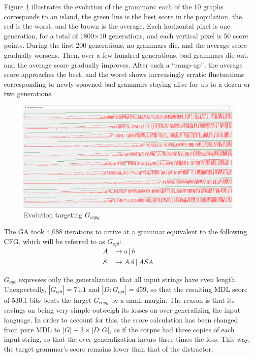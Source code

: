 \documentclass{article}
\begin{document}
Figure \ref{fig:progress} illustrates the evolution of the grammars:
each of the 10 graphs corresponds to an island, the green line is the best score in the population,
the red is the worst, and the brown is the average. Each horizontal pixel is one generation,
for a total of 1800$\times$10 generations, and each vertical pixel is 50 score points.
During the first 200 generations, no grammars die, and the average score gradually worsens.
Then, over a few hundred generations, bad grammars die out, and the average score gradually improves.
After such a ``ramp-up'', the average score approaches the best, and the worst shows
increasingly erratic fluctuations corresponding to newly spawned bad grammars staying alive
for up to a dozen or two generations.

\begin{figure}[b!]
\includegraphics[width=\textwidth]{progress.png}
\caption{Evolution targeting $G_{copy}$}
\label{fig:progress}
\end{figure}

The GA took 4,088 iterations to arrive at a grammar equivalent to the following CFG,
which will be referred to as $G_{opt}$:
\begin{align*}
A &\rightarrow a\,|\,b \\
S &\rightarrow AA\,|\,ASA
\end{align*}

$G_{opt}$ expresses only the generalization that all input strings have even length.
Unexpectedly, $|G_{opt}|=71.1$ and $|D:G_{opt}|=459$, so that the resulting MDL score of 530.1 bits
beats the target $G_{copy}$ by a small margin. The reason is that its savings on being very simple
outweigh its losses on over-generalizing the input language.
In order to account for this, the score calculation has been changed from pure MDL to
$|G| + 3\times|D:G|$, as if the corpus had three copies of each input string,
so that the over-generalization incurs three times the loss.
This way, the target grammar's score remains lower than that of the distractor:
\end{document}
